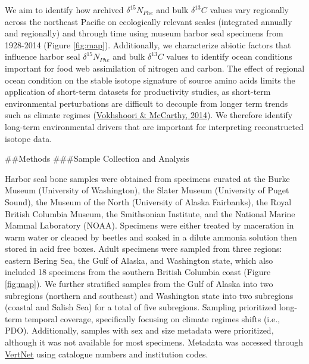 \documentclass [11pt, proquest] {uwthesis}[2015/03/03]
\begin{document}
We aim to identify how archived \(\delta^{15}N_{Phe}\) and bulk \(\delta^{13}C\) values vary regionally across the northeast Pacific on ecologically relevant scales (integrated annually and regionally) and through time using museum harbor seal specimens from 1928-2014 (Figure \ref{fig:map}). Additionally, we characterize abiotic factors that influence harbor seal \(\delta^{15}N_{Phe}\) and bulk \(\delta^{13}C\) values to identify ocean conditions important for food web assimilation of nitrogen and carbon. The effect of regional ocean condition on the stable isotope signature of source amino acids limits the application of short-term datasets for productivity studies, as short-term environmental perturbations are difficult to decouple from longer term trends such as climate regimes (\protect\hyperlink{ref-Vokshoori2014}{Vokhshoori \& McCarthy, 2014}). We therefore identify long-term environmental drivers that are important for interpreting reconstructed isotope data.

\#\#Methods
\#\#\#Sample Collection and Analysis

Harbor seal bone samples were obtained from specimens curated at the Burke Museum (University of Washington), the Slater Museum (University of Puget Sound), the Museum of the North (University of Alaska Fairbanks), the Royal British Columbia Museum, the Smithsonian Institute, and the National Marine Mammal Laboratory (NOAA). Specimens were either treated by maceration in warm water or cleaned by beetles and soaked in a dilute ammonia solution then stored in acid free boxes. Adult specimens were sampled from three regions: eastern Bering Sea, the Gulf of Alaska, and Washington state, which also included 18 specimens from the southern British Columbia coast (Figure \ref{fig:map}). We further stratified samples from the Gulf of Alaska into two subregions (northern and southeast) and Washington state into two subregions (coastal and Salish Sea) for a total of five subregions. Sampling prioritized long-term temporal coverage, specifically focusing on climate regimes shifts (i.e., PDO). Additionally, samples with sex and size metadata were prioritized, although it was not available for most specimens. Metadata was accessed through \href{http://www.vertnet.org/index.html}{VertNet} using catalogue numbers and institution codes.
\end{document}
